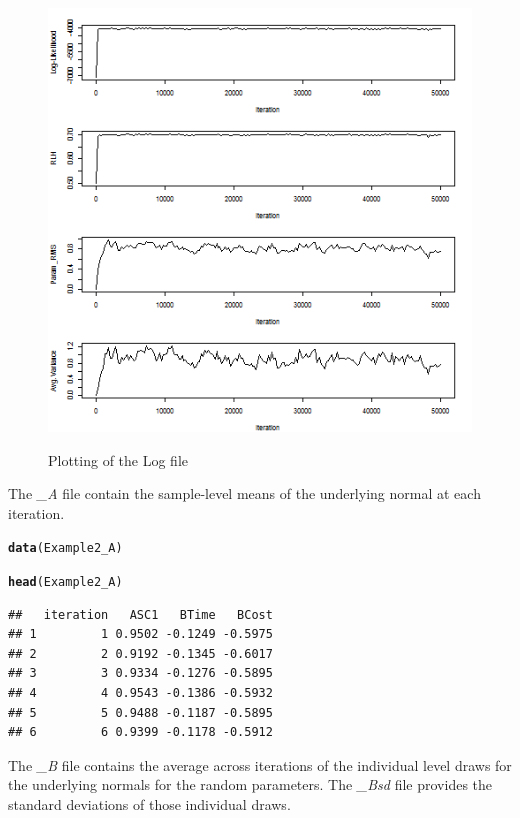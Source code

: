 \documentclass{article}\usepackage{graphicx, color}
\makeatletter
\newcommand{\hlfunctioncall}[1]{\textcolor[rgb]{0.501960784313725,0,0.329411764705882}{\textbf{#1}}}%
\newenvironment{kframe}{%
 \def\at@end@of@kframe{}%
 \ifinner\ifhmode%
  \def\at@end@of@kframe{\end{minipage}}%
  \begin{minipage}{\columnwidth}%
 \fi\fi%
 \def\FrameCommand##1{\hskip\@totalleftmargin \hskip-\fboxsep
 \colorbox{shadecolor}{##1}\hskip-\fboxsep
     \hskip-\linewidth \hskip-\@totalleftmargin \hskip\columnwidth}%
 \MakeFramed {\advance\hsize-\width
   \@totalleftmargin\z@ \linewidth\hsize
   \@setminipage}}%
 {\par\unskip\endMakeFramed%
 \at@end@of@kframe}
\newenvironment{knitrout}{}{} %
\makeatother
\begin{document}
\begin{figure}
\caption{Plotting of the Log file}
\includegraphics[scale=0.50]{MNL_logPlot2.png}
\label{logfile2}
\end{figure}

The \emph{\_A} file contain the sample-level means of the underlying normal at each iteration.

\begin{knitrout}
\color{fgcolor}\begin{kframe}
\begin{alltt}

\hlfunctioncall{data}(Example2_A)

\hlfunctioncall{head}(Example2_A)
\end{alltt}
\begin{verbatim}
##   iteration   ASC1   BTime   BCost
## 1         1 0.9502 -0.1249 -0.5975
## 2         2 0.9192 -0.1345 -0.6017
## 3         3 0.9334 -0.1276 -0.5895
## 4         4 0.9543 -0.1386 -0.5932
## 5         5 0.9488 -0.1187 -0.5895
## 6         6 0.9399 -0.1178 -0.5912
\end{verbatim}
\end{kframe}
\end{knitrout}


The \emph{\_B} file contains the average across iterations of the individual level draws for the underlying normals for the random parameters. The \emph{\_Bsd} file provides the standard deviations of those individual draws.
\end{document}
